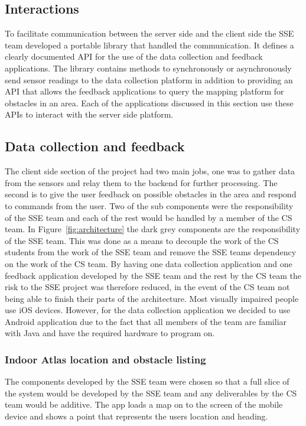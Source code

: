 \documentclass[prodmode,acmtosem]{acmsmall} %
\begin{document}
\subsection{Interactions}
\label{sec:interactions}
To facilitate communication between the server side and the client side the SSE team developed a portable library that handled the communication. It defines a clearly documented API for the use of the data collection and feedback applications. The library contains methods to synchronously or asynchronously send sensor readings to the data collection platform in addition to providing an API that allows the feedback applications to query the mapping platform for obstacles in an area. Each of the applications discussed in this section use these APIs to interact with the server side platform.

\subsection{Data collection and feedback}
The client side section of the project had two main jobs, one was to gather data from the sensors and relay them to the backend for further processing. The second is to give the user feedback on possible obstacles in the area and respond to commands from the user. Two of the sub components were the responsibility of the SSE team and each of the rest would be handled by a member of the CS team. In Figure~\ref{fig:architecture} the dark grey components are the responsibility of the SSE team. This was done as a means to decouple the work of the CS students from the work of the SSE team and remove the SSE teams dependency on the work of the CS team. By having one data collection application and one feedback application developed by the SSE team and the rest by the CS team the risk to the SSE project was therefore reduced, in the event of the CS team not being able to finish their parts of the architecture. Most visually impaired people use iOS devices. However, for the data collection application we decided to use Android application due to the fact that all members of the team are familiar with Java and have the required hardware to program on.

\subsubsection{Indoor Atlas location and obstacle listing}
The components developed by the SSE team were chosen so that a full slice of the system would be developed by the SSE team and any deliverables by the CS team would be additive. The app loads a map on to the screen of the mobile device and shows a point that represents the users location and heading.
\end{document}
